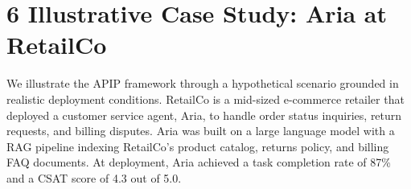 \section{6  Illustrative Case Study: Aria at RetailCo}

We illustrate the APIP framework through a hypothetical scenario grounded in realistic deployment conditions. RetailCo is a mid-sized e-commerce retailer that deployed a customer service agent, Aria, to handle order status inquiries, return requests, and billing disputes. Aria was built on a large language model with a RAG pipeline indexing RetailCo's product catalog, returns policy, and billing FAQ documents. At deployment, Aria achieved a task completion rate of 87\% and a CSAT score of 4.3 out of 5.0.

